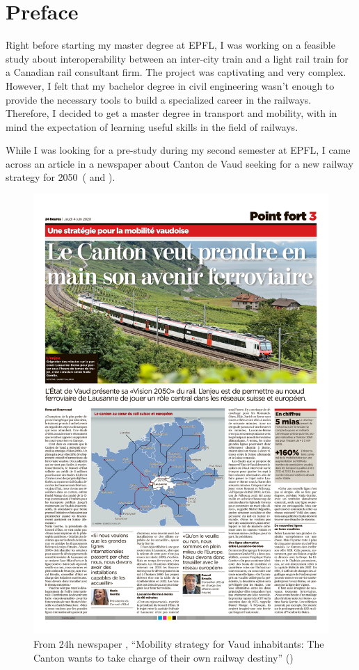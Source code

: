 \documentclass[helv,dvipsnames]{apa7}
\begin{document}
\section{Preface}
Right before starting my master degree at EPFL, I was working on a feasible study about interoperability between an inter-city train and a light rail train for a Canadian rail consultant firm. The project was captivating and very complex. However, I felt that my bachelor degree in civil engineering wasn't enough to provide the necessary tools to build a specialized career in the railways. Therefore, I decided to get a master degree in transport and mobility, with in mind the expectation of learning useful skills in the field of railways.
\par While I was looking for a pre-study during my second semester at EPFL, I came across an article in a newspaper about Canton de Vaud seeking for a new railway strategy for 2050~(\cite{vaud2050} and \cite{tempsvision2050}). 
\begin{figure}[h]
    \centering
    \includegraphics[scale = 0.55]{Figures/24h4.6.20bis_Conclusion.pdf}
    \caption{From 24h newspaper , “Mobility strategy for Vaud inhabitants: The Canton wants to take charge of their own railway destiny” (\cite{24hmobilite})}
    \label{fig:24h_mobility}
\end{figure}
\end{document}
